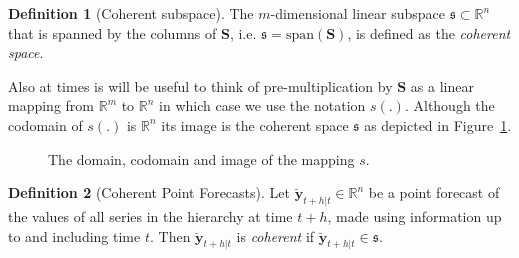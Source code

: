 \documentclass[a4paper, 11pt]{article}
\theoremstyle{theo}
\theoremstyle{definition}
\newtheorem{definition}{Definition}[section]
\begin{document}
\begin{definition}[Coherent subspace]\label{def:cohspace}
 The $m$-dimensional linear subspace $\mathfrak{s}\subset \mathbb{R}^n$ that is spanned by the columns of $\bm{S}$, i.e. $\mathfrak{s}=\mbox{span}(\bm{S})$, is defined as the {\em coherent space}. 
\end{definition}

Also at times is  will be useful to think of pre-multiplication by $\bm{S}$ as a linear mapping from $\mathbb{R}^m$ to $\mathbb{R}^n$ in which case we use the notation $s(.)$.  Although the codomain of $s(.)$ is $\mathbb{R}^n$ its image is the coherent space $\mathfrak{s}$ as depicted in Figure~\ref{fig2}.

\begin{figure}[H]
  \begin{center}
    \newline
  \end{center}
  \caption{The domain, codomain and image of the mapping $s$.}\label{fig2}
\end{figure}

\begin{definition}[Coherent Point Forecasts]\label{def:cohpoint}
  Let $\breve{\bm{y}}_{t+h|t} \in \mathbb{R}^n$ be a point forecast of the values of all series in the hierarchy at time $t+h$,  made using information up to and including time $t$.  Then $\breve{\bm{y}}_{t+h|t}$ is \emph{coherent} if $\breve{\bm{y}}_{t+h|t} \in \mathfrak{s}$. 
\end{definition}
\end{document}
